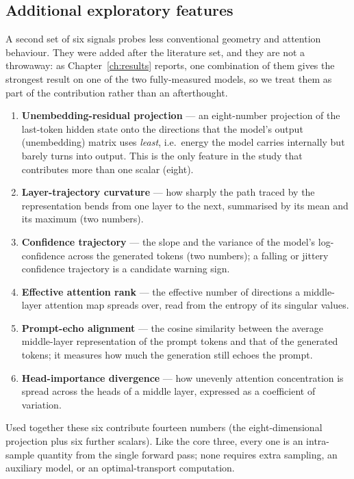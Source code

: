 \subsection{Additional exploratory features}
\label{sec:newfeat}

A second set of six signals probes less conventional geometry and attention behaviour. They
were added after the literature set, and they are not a throwaway: as
Chapter~\ref{ch:results} reports, one combination of them gives the strongest result on one
of the two fully-measured models, so we treat them as part of the contribution rather than
an afterthought.

\begin{enumerate}[leftmargin=2.1em,itemsep=0.25em,label=\textbf{(\arabic*)}]
\item \textbf{Unembedding-residual projection} --- an eight-number projection of the
last-token hidden state onto the directions that the model's output (unembedding) matrix
uses \emph{least}, i.e.\ energy the model carries internally but barely turns into output.
This is the only feature in the study that contributes more than one scalar (eight).
\item \textbf{Layer-trajectory curvature} --- how sharply the path traced by the
representation bends from one layer to the next, summarised by its mean and its maximum (two
numbers).
\item \textbf{Confidence trajectory} --- the slope and the variance of the model's
log-confidence across the generated tokens (two numbers); a falling or jittery confidence
trajectory is a candidate warning sign.
\item \textbf{Effective attention rank} --- the effective number of directions a
middle-layer attention map spreads over, read from the entropy of its singular values.
\item \textbf{Prompt-echo alignment} --- the cosine similarity between the average
middle-layer representation of the prompt tokens and that of the generated tokens; it
measures how much the generation still echoes the prompt.
\item \textbf{Head-importance divergence} --- how unevenly attention concentration is spread
across the heads of a middle layer, expressed as a coefficient of variation.
\end{enumerate}

Used together these six contribute fourteen numbers (the eight-dimensional projection plus
six further scalars). Like the core three, every one is an intra-sample quantity from the
single forward pass; none requires extra sampling, an auxiliary model, or an
optimal-transport computation.

